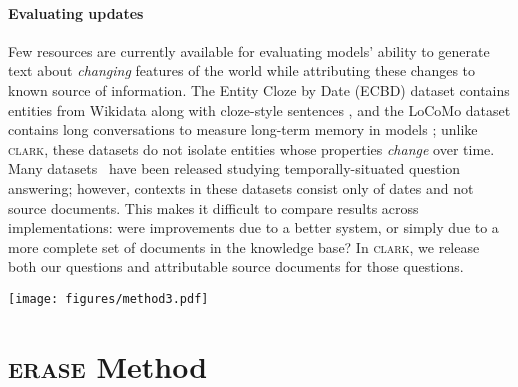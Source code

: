 \documentclass[11pt]{article}
\newcommand{\ourmethod}{\textsc{erase}\xspace}
\newcommand{\ourdataset}{\textsc{clark}\xspace}
\begin{document}
\paragraph{Evaluating updates}
Few resources are currently available for evaluating models' ability to generate text about \emph{changing} features of the world while attributing these changes to known source of information.
The Entity Cloze by Date (ECBD) dataset contains entities from Wikidata along with cloze-style sentences \citep{onoe-etal-2022-entity}, and the LoCoMo dataset contains long conversations to measure long-term memory in models \citep{maharana2024lococmo}; unlike \ourdataset, these datasets do not isolate entities whose properties \emph{change} over time.
Many datasets~\citep{zhang-choi-2021-situatedqa,timeqa,meem2024patquestions,dhingra-etal-2022-time,kasai2023realtime,vu2023freshllms} have been released studying temporally-situated question answering; 
however, contexts in these datasets consist only of dates and not source documents.
This makes it difficult to compare results across implementations: were improvements due to a better system, or simply due to a more complete set of documents in the knowledge base?
In \ourdataset, we release both our questions and attributable source documents for those questions.







\begin{figure*}[ht!]
    \centering
    \texttt{[image: figures/method3.pdf]}
    \caption{Overview of \ourmethod. We begin by retrieving existing facts relevant to input and prompting a LM to update them. We also extract facts from the input to add to our knowledge base.}
    \label{fig:method}
\end{figure*}

\section{\ourmethod Method}
\label{s:method}
\end{document}
